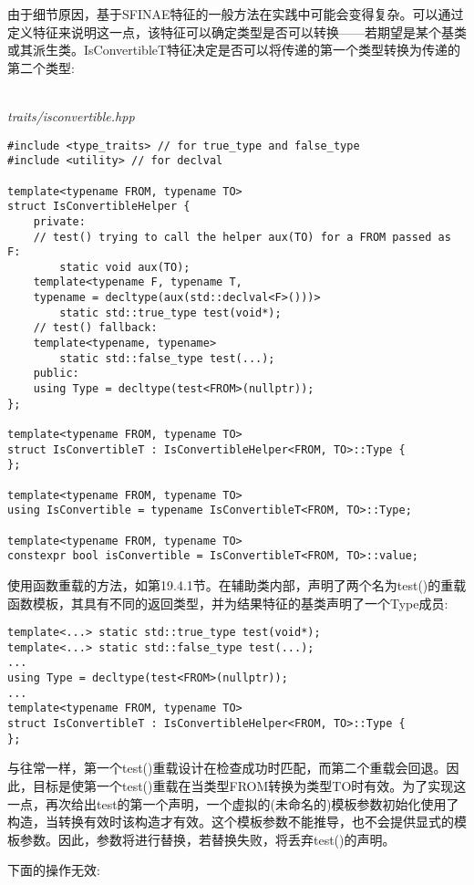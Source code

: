由于细节原因，基于SFINAE特征的一般方法在实践中可能会变得复杂。可以通过定义特征来说明这一点，该特征可以确定类型是否可以转换——若期望是某个基类或其派生类。IsConvertibleT特征决定是否可以将传递的第一个类型转换为传递的第二个类型:

\hspace*{\fill} \\ %
\noindent
\textit{traits/isconvertible.hpp}
\begin{lstlisting}[style=styleCXX]
#include <type_traits> // for true_type and false_type
#include <utility> // for declval

template<typename FROM, typename TO>
struct IsConvertibleHelper {
	private:
	// test() trying to call the helper aux(TO) for a FROM passed as F:
		static void aux(TO);
	template<typename F, typename T,
	typename = decltype(aux(std::declval<F>()))>
		static std::true_type test(void*);
	// test() fallback:
	template<typename, typename>
		static std::false_type test(...);
	public:
	using Type = decltype(test<FROM>(nullptr));
};

template<typename FROM, typename TO>
struct IsConvertibleT : IsConvertibleHelper<FROM, TO>::Type {
};

template<typename FROM, typename TO>
using IsConvertible = typename IsConvertibleT<FROM, TO>::Type;

template<typename FROM, typename TO>
constexpr bool isConvertible = IsConvertibleT<FROM, TO>::value;
\end{lstlisting}

使用函数重载的方法，如第19.4.1节。在辅助类内部，声明了两个名为test()的重载函数模板，其具有不同的返回类型，并为结果特征的基类声明了一个Type成员:

\begin{lstlisting}[style=styleCXX]
template<...> static std::true_type test(void*);
template<...> static std::false_type test(...);
...
using Type = decltype(test<FROM>(nullptr));
...
template<typename FROM, typename TO>
struct IsConvertibleT : IsConvertibleHelper<FROM, TO>::Type {
};
\end{lstlisting}

与往常一样，第一个test()重载设计在检查成功时匹配，而第二个重载会回退。因此，目标是使第一个test()重载在当类型FROM转换为类型TO时有效。为了实现这一点，再次给出test的第一个声明，一个虚拟的(未命名的)模板参数初始化使用了构造，当转换有效时该构造才有效。这个模板参数不能推导，也不会提供显式的模板参数。因此，参数将进行替换，若替换失败，将丢弃test()的声明。

下面的操作无效:


